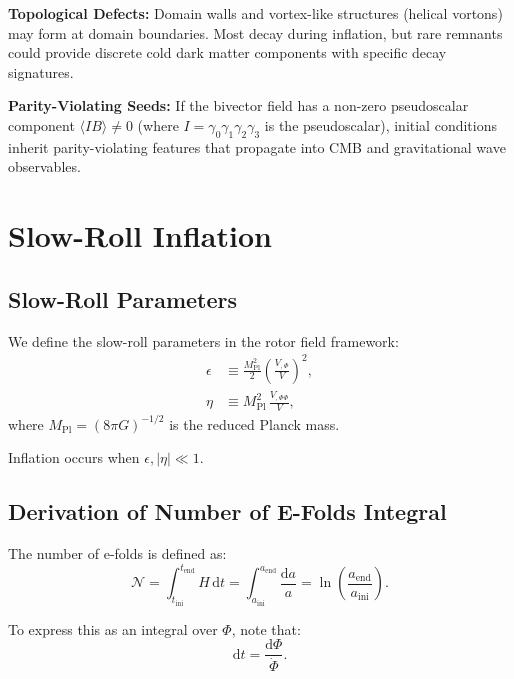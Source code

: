 \documentclass[11pt,a4paper]{article}
\numberwithin{equation}{section}
\theoremstyle{plain}
\theoremstyle{definition}
\theoremstyle{remark}
\newcommand{\dd}{\mathrm{d}}
\begin{document}
\textbf{Topological Defects:} Domain walls and vortex-like structures (helical vortons) may form at domain boundaries. Most decay during inflation, but rare remnants could provide discrete cold dark matter components with specific decay signatures.

\textbf{Parity-Violating Seeds:} If the bivector field has a non-zero pseudoscalar component $\langle I B \rangle \neq 0$ (where $I = \gamma_0\gamma_1\gamma_2\gamma_3$ is the pseudoscalar), initial conditions inherit parity-violating features that propagate into CMB and gravitational wave observables.

\section{Slow-Roll Inflation}
\label{sec:slowroll}

\subsection{Slow-Roll Parameters}

We define the slow-roll parameters in the rotor field framework:
\begin{align}
\epsilon &\equiv \frac{M_{\mathrm{Pl}}^2}{2}\left(\frac{V_{,\Phi}}{V}\right)^2,\label{eq:epsilon}\\
\eta &\equiv M_{\mathrm{Pl}}^2\,\frac{V_{,\Phi\Phi}}{V},\label{eq:eta}
\end{align}
where $M_{\mathrm{Pl}} = (8\pi G)^{-1/2}$ is the reduced Planck mass.

Inflation occurs when $\epsilon, |\eta| \ll 1$.

\subsection{Derivation of Number of E-Folds Integral}

The number of e-folds is defined as:
\begin{equation}
\mathcal{N} = \int_{t_{\mathrm{ini}}}^{t_{\mathrm{end}}} H\,\dd t = \int_{a_{\mathrm{ini}}}^{a_{\mathrm{end}}} \frac{\dd a}{a} = \ln\left(\frac{a_{\mathrm{end}}}{a_{\mathrm{ini}}}\right).
\label{eq:efolds-def}
\end{equation}

To express this as an integral over $\Phi$, note that:
\begin{equation}
\dd t = \frac{\dd\Phi}{\dot{\Phi}}.
\end{equation}
\end{document}
